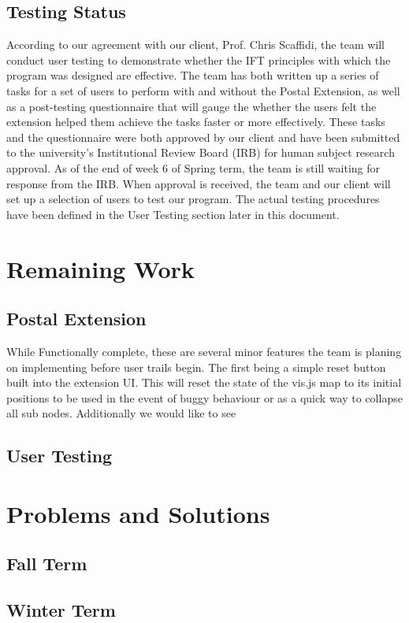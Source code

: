 \documentclass[letterpaper,10pt,titlepage,draftclsnofoot,onecolumn,onesided] {IEEEtran}
\begin{document}
	\subsection{Testing Status}
	According to our agreement with our client, Prof. Chris Scaffidi, the team will conduct user testing to demonstrate whether the IFT principles with which the program was designed are effective.
	The team has both written up a series of tasks for a set of users to perform with and without the Postal Extension, as well as a post-testing questionnaire that will gauge the whether the users felt the extension helped them achieve the tasks faster or more effectively.
	These tasks and the questionnaire were both approved by our client and have been submitted to the university's Institutional Review Board (IRB) for human subject research approval.
	As of the end of week 6 of Spring term, the team is still waiting for response from the IRB.
	When approval is received, the team and our client will set up a selection of users to test our program.
	The actual testing procedures have been defined in the User Testing section later in this document.
	
\section{Remaining Work}
	\subsection{Postal Extension}
	While Functionally complete, these are several minor features the team is planing on implementing before user trails begin. 
	The first being a simple reset button built into the extension UI. 
	This will reset the state of the vis.js map to its initial positions to be used in the event of buggy behaviour or as a quick way to collapse all sub nodes.
	Additionally we would like to see 
	\subsection{User Testing}

\section{Problems and Solutions}
	\subsection{Fall Term}
	
	
	\subsection{Winter Term}
	
\end{document}
